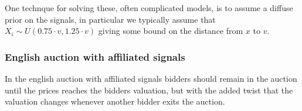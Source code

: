 One technque for solving these, often complicated models, is to assume a diffuse prior on the signals, in particular we typically assume that $X_i \sim U(0.75\cdot v, 1.25\cdot v)$ giving some bound on the distance from $x$ to $v$.

\subsubsection{English auction with affiliated signals}
In the english auction with affiliated signals bidders should remain in the auction until the prices reaches the bidders valuation, but with the added twist that the valuation changes whenever another bidder exits the auction.

